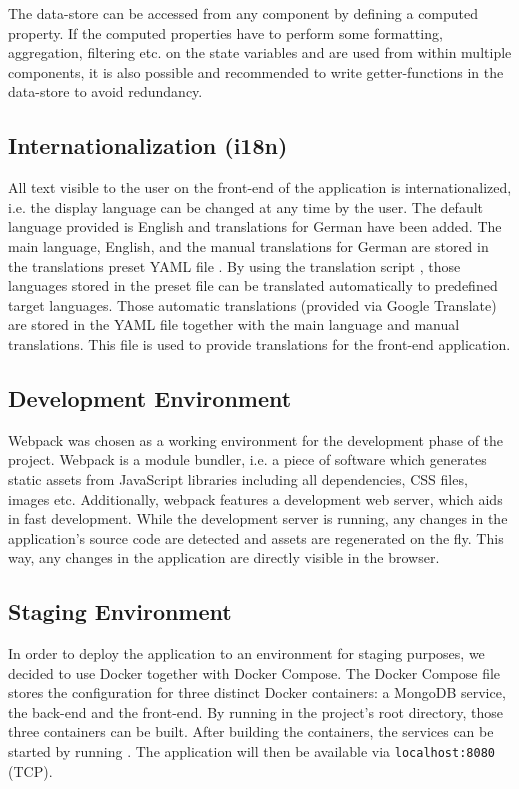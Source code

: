 The data-store can be accessed from any component by defining a computed property. If the computed properties have to perform some formatting, aggregation, filtering etc. on the state variables and are used from within multiple components, it is also possible and recommended to write getter-functions in the data-store to avoid redundancy.

\subsection{Internationalization (i18n)}

All text visible to the user on the front-end of the application is internationalized, i.e. the display language can be changed at any time by the user. The default language provided is English and translations for German have been added. The main language, English, and the manual translations for German are stored in the translations preset YAML file . By using the translation script , those languages stored in the preset file can be translated automatically to predefined target languages. Those automatic translations (provided via Google Translate) are stored in the YAML file  together with the main language and manual translations. This file is used to provide translations for the front-end application. 

\subsection{Development Environment}
Webpack was chosen as a working environment for the development phase of the project. Webpack is a module bundler, i.e. a piece of software which generates static assets from JavaScript libraries including all dependencies, CSS files, images etc. Additionally, webpack features a development web server, which aids in fast development. While the development server is running, any changes in the application's source code are detected and assets are regenerated on the fly. This way, any changes in the application are directly visible in the browser.

\subsection{Staging Environment}
In order to deploy the application to an environment for staging purposes, we decided to use Docker together with Docker Compose. The Docker Compose file  stores the configuration for three distinct Docker containers: a MongoDB service, the back-end and the front-end. By running  in the project's root directory, those three containers can be built. After building the containers, the services can be started by running . The application will then be available via \texttt{localhost:8080} (TCP).

